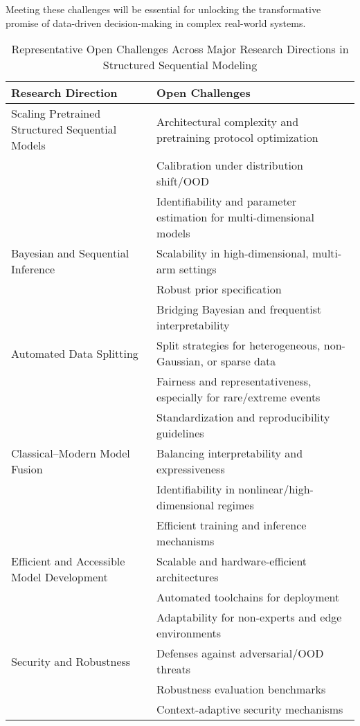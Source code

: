 \documentclass[sigconf]{acmart}
\begin{document}
Meeting these challenges will be essential for unlocking the transformative promise of data-driven decision-making in complex real-world systems.
\usepackage{array} 
\begin{table*}[htbp]
\centering
\caption{Representative Open Challenges Across Major Research Directions in Structured Sequential Modeling}
\label{tab:open_challenges}
\begin{adjustbox}{max width=\textwidth}
\begin{tabular}{>{\raggedright\arraybackslash}p{4.2cm} >{\raggedright\arraybackslash}p{12.8cm}}
\toprule
\textbf{Research Direction} & \textbf{Open Challenges} \\
\midrule
Scaling Pretrained Structured Sequential Models &
Architectural complexity and pretraining protocol optimization \\
& Calibration under distribution shift/OOD \\
& Identifiability and parameter estimation for multi-dimensional models \\
\addlinespace
Bayesian and Sequential Inference &
Scalability in high-dimensional, multi-arm settings \\
& Robust prior specification \\
& Bridging Bayesian and frequentist interpretability \\
\addlinespace
Automated Data Splitting &
Split strategies for heterogeneous, non-Gaussian, or sparse data \\
& Fairness and representativeness, especially for rare/extreme events \\
& Standardization and reproducibility guidelines \\
\addlinespace
Classical--Modern Model Fusion &
Balancing interpretability and expressiveness \\
& Identifiability in nonlinear/high-dimensional regimes \\
& Efficient training and inference mechanisms \\
\addlinespace
Efficient and Accessible Model Development &
Scalable and hardware-efficient architectures \\
& Automated toolchains for deployment \\
& Adaptability for non-experts and edge environments \\
\addlinespace
Security and Robustness &
Defenses against adversarial/OOD threats \\
& Robustness evaluation benchmarks \\
& Context-adaptive security mechanisms \\

\end{tabular}
\end{adjustbox}
\end{table*}
\end{document}
